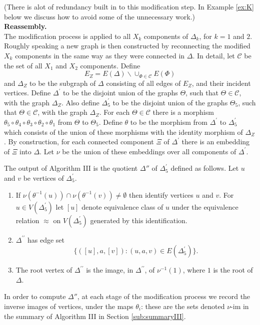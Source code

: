 \documentclass[a4paper,12pt]{article}
\newcommand{\D}{\Delta }
\newcommand{\T}{\Theta }
\newcommand{\nul}{\emptyset }
\newcommand{\vim}{\nu\textrm{-im}}
\numberwithin{equation}{section}
\numberwithin{figure}{section}
\newcommand{\cC}{\mathcal{C}}
\newcommand{\bs}{\backslash}
\newcommand{\be}{\begin{enumerate}}
\newcommand{\ee}{\end{enumerate}}
\begin{document}
(There is alot of redundancy built in to this modification step. In 
Example \ref{ex:K} below we discuss how to avoid some of the unnecessary
 work.)\\[1em]


\noindent\textbf{Reassembly.}\\
The modification process is applied to all $X_k$ components of $\D_k$,
for $k=1$ and $2$. Roughly speaking a new graph is then constructed by
reconnecting the modified $X_k$ components in the same way as they
were connected in $\D$. In detail,
let $\cC$ be the set of all
$X_1$ and $X_2$ components.
Define
\[E_Z=E(\D)\bs \cup_{\Phi\in \cC} E(\Phi)\]
and $\D_Z$ to be the subgraph of $\D$ consisting of all edges
of $E_Z$, and their incident vertices.
Define $\D^\prime$ to be the disjoint union of the
 graphs $\T$, such that $\T\in \cC$, with  the graph $\D_Z$.
Also define $\D^{\prime}_5$ to be the disjoint union of the graphs
$\T_5$, such that $\T\in \cC$, with the graph $\D_Z$. For each
$\T\in \cC$ there is  a morphism
$\theta_5\circ\theta_4\circ\theta_3\circ\theta_2\circ\theta_1$
from $\T$ to $\T_5$. Define $\theta$ to be the morphism from
$\D^\prime$ to $\D^\prime_5$ which consists of the union of these
morphisms with the identity morphism of $\D_Z$. By
construction, for each connected component $\Xi$ of $\D^\prime$
there is an embedding of $\Xi$ into $\D$. Let $\nu$ be the union
of these embeddings over all components of $\D^\prime$.

The output of Algorithm III is the quotient $\D''$ of
 $\D^\prime_5$ defined as follows.
Let $u$ and $v$ be vertices
 of $\D^\prime_5$.
\be[R1]
\item\label{it:R1} If $\nu(\theta^{-1}(u))\cap \nu(\theta^{-1}(v))\neq \nul$ then
identify vertices $u$ and $v$.
For $u \in V(\D^\prime_5)$ let
$[u]$  denote equivalence class of $u$ under the equivalence relation $\approx$ 
on $V(\D^\prime_5)$ generated by this identification.
\item
$\D^{\prime\prime}$ has edge set
\[\{([u],a,[v]): (u,a,v)\in E(\D^\prime_5)\}.\]
\item The root vertex of $\D^{\prime\prime}$ is the image, in
$\D^{\prime\prime}$, of $\nu^{-1}(1)$, where $1$ is  the root of
$\D$.
\ee
In order to compute $\D''$, at each stage of the modification process
we record the inverse images of vertices, under the maps $\theta_i$: these are the
sets denoted $\vim$ in the summary of Algorithm III in Section \ref{sub:summaryIII}.
\end{document}
